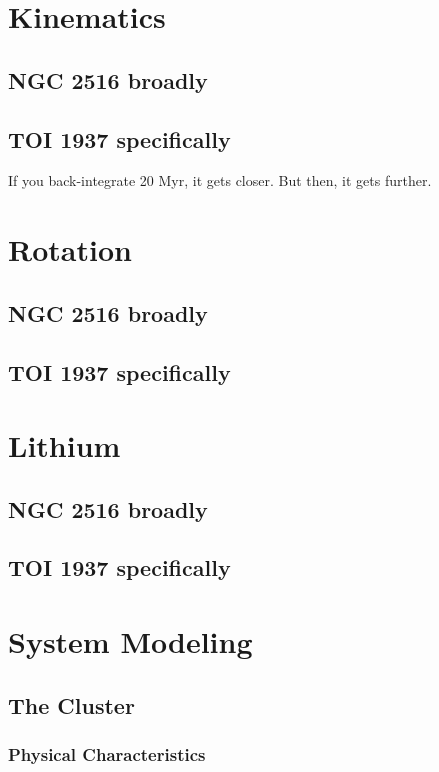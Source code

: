 \documentclass[12pt,twocolumn,tighten]{aastex63}
\begin{document}

\section{Kinematics}

  \subsection{NGC 2516 broadly}
  \subsection{TOI 1937 specifically}
  If you back-integrate 20 Myr, it gets closer. But then, it gets
  further.

\section{Rotation}

  \subsection{NGC 2516 broadly}
  \subsection{TOI 1937 specifically}

\section{Lithium}

  \subsection{NGC 2516 broadly}
  \subsection{TOI 1937 specifically}

\section{System Modeling}
\label{sec:system}


\subsection{The Cluster}
\label{subsec:cluster}

\subsubsection{Physical Characteristics}
\label{subsec:clusterchar}
\end{document}
